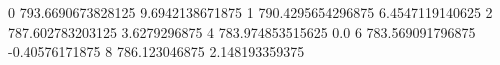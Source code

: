 0 793.6690673828125 9.6942138671875
1 790.4295654296875 6.4547119140625
2 787.602783203125 3.6279296875
4 783.974853515625 0.0
6 783.569091796875 -0.40576171875
8 786.123046875 2.148193359375

